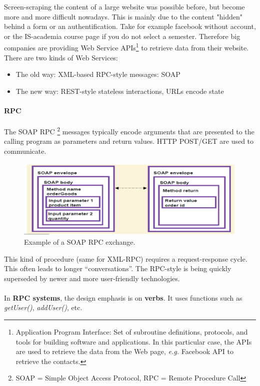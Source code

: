Screen-scraping the content of a large website was possible before, but become more and more difficult nowadays. This is mainly due to the content "hidden" behind a form or an authentification. Take for example facebook without account, or the IS-academia course page if you do not select a semester. Therefore big companies are providing Web Service APIs\footnote{Application Program Interface: Set of subroutine definitions, protocols, and tools for building software and applications. In this particular case, the APIs are used to retrieve the data from the Web page, {\it e.g.} Facebook API to retrieve the contacts.} to retrieve data from their website. There are two kinds of Web Services:
\begin{itemize}
 \item The old way: XML-based RPC-style messages: SOAP
 \item The new way: REST-style stateless interactions, URLs encode state
\end{itemize}

\paragraph{RPC}

The SOAP RPC \footnote{SOAP = Simple Object Access Protocol, RPC = Remote Procedure Call} messages typically encode arguments that are presented to the calling program as parameters and return values. HTTP POST/GET are used to communicate.
\begin{figure}[H]%
 \centering
 \includegraphics[width=13cm]{./img/04/soap-rpc}
 \caption{\label{pic:soap-rpc} Example of a SOAP RPC exchange.}
\end{figure}
This kind of procedure (same for XML-RPC) requires a request-response cycle. This often leads to longer ``conversations''. The RPC-style is being quickly superseded by newer and more user-friendly technologies.\\\\
In {\bf RPC systems}, the design emphasis is on {\bf verbs}. It uses functions such as {\it getUser()}, {\it addUser()}, etc.


